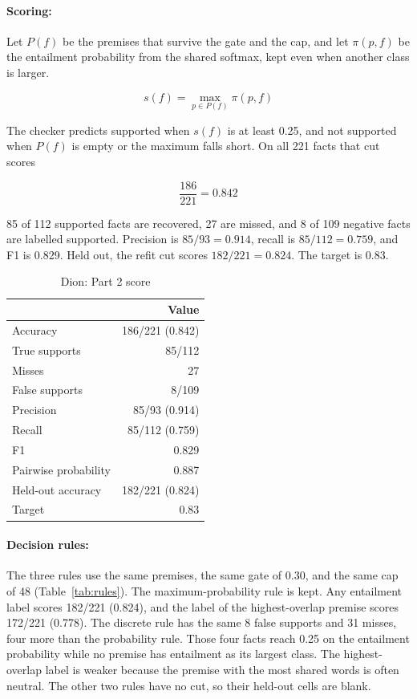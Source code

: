 \documentclass[12pt,a4paper]{article}
\begin{document}
\paragraph{Scoring:}

Let \(P(f)\) be the premises that survive the gate and the cap, and let \(\pi(p,f)\) be the entailment probability from the shared softmax, kept even when another class is larger.

\begin{equation}
s(f)=\max_{p\in P(f)}\pi(p,f)
\end{equation}

The checker predicts supported when \(s(f)\) is at least 0.25, and not supported when \(P(f)\) is empty or the maximum falls short. On all 221 facts that cut scores

\[
\frac{186}{221}=0.842
\]

85 of 112 supported facts are recovered, 27 are missed, and 8 of 109 negative facts are labelled supported. Precision is \(85/93=0.914\), recall is \(85/112=0.759\), and F1 is 0.829. Held out, the refit cut scores \(182/221=0.824\). The target is 0.83.

\begin{table}[H]
\centering
\small
\begin{tabular}{@{}lr@{}}
\toprule
 & Value \\
\midrule
Accuracy & 186/221 (0.842) \\
True supports & 85/112 \\
Misses & 27 \\
False supports & 8/109 \\
Precision & 85/93 (0.914) \\
Recall & 85/112 (0.759) \\
F1 & 0.829 \\
Pairwise probability & 0.887 \\
Held-out accuracy & 182/221 (0.824) \\
Target & 0.83 \\
\bottomrule
\end{tabular}
\caption{Dion: Part 2 score}
\label{tab:p2score}
\end{table}

\paragraph{Decision rules:}

The three rules use the same premises, the same gate of 0.30, and the same cap of 48 (Table~\ref{tab:rules}). The maximum-probability rule is kept. Any entailment label scores 182/221 (0.824), and the label of the highest-overlap premise scores 172/221 (0.778). The discrete rule has the same 8 false supports and 31 misses, four more than the probability rule. Those four facts reach 0.25 on the entailment probability while no premise has entailment as its largest class. The highest-overlap label is weaker because the premise with the most shared words is often neutral. The other two rules have no cut, so their held-out cells are blank.
\end{document}
